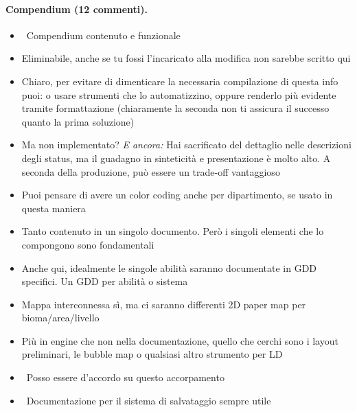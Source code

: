 \paragraph{Compendium (12 commenti).}
{\small
\begin{itemize}
  \item {} \rvBene\ Compendium contenuto e funzionale
  \item {} Eliminabile, anche se tu fossi l'incaricato alla modifica non sarebbe scritto qui
  \item {} Chiaro, per evitare di dimenticare la necessaria compilazione di questa info puoi: o usare strumenti che lo automatizzino, oppure renderlo più evidente tramite formattazione (chiaramente la seconda non ti assicura il successo quanto la prima soluzione)
  \item {} Ma non implementato? \emph{E ancora:} Hai sacrificato del dettaglio nelle descrizioni degli status, ma il guadagno in sinteticità e presentazione è molto alto. A seconda della produzione, può essere un trade-off vantaggioso
  \item {} Puoi pensare di avere un color coding anche per dipartimento, se usato in questa maniera
  \item {} Tanto contenuto in un singolo documento. Però i singoli elementi che lo compongono sono fondamentali
  \item {} Anche qui, idealmente le singole abilità saranno documentate in GDD specifici. Un GDD per abilità o sistema
  \item {} Mappa interconnessa sì, ma ci saranno differenti 2D paper map per bioma/area/livello
  \item {} Più in engine che non nella documentazione, quello che cerchi sono i layout preliminari, le bubble map o qualsiasi altro strumento per LD
  \item {} \rvBene\ Posso essere d'accordo su questo accorpamento
  \item {} \rvBene\ Documentazione per il sistema di salvataggio sempre utile
\end{itemize}
}
